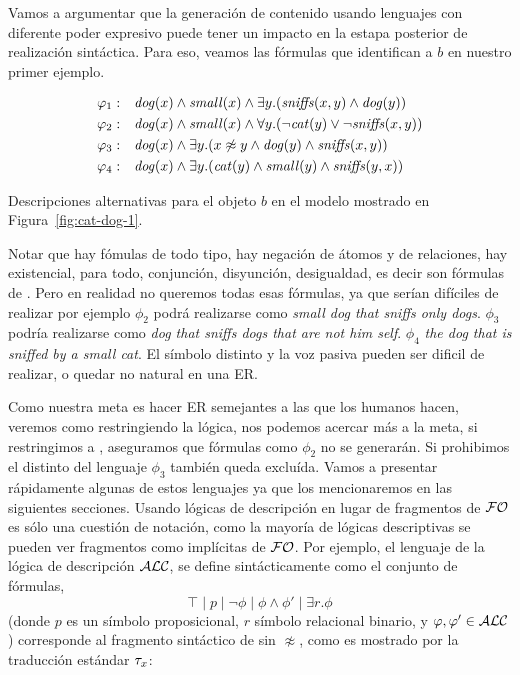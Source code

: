Vamos a argumentar que la generaci\'on de contenido usando lenguajes con diferente poder expresivo puede tener un impacto en la estapa posterior de realizaci\'on sint\'actica. Para eso, veamos las f\'ormulas que identifican a $b$ en nuestro primer ejemplo.

\begin{table}[h]
$$
\begin{array}{cl}
 \varphi_1: & \mathit{dog}(x) \land \mathit{small}(x) \land
   \exists y . (\mathit{sniffs}(x,y) \land \mathit{dog}(y))\\[3pt]
  \varphi_2: & \mathit{dog}(x) \land \mathit{small}(x) \land
  \forall y . (\neg \mathit{cat}(y) \lor \neg \mathit{sniffs}(x,y))\\[3pt]
  \varphi_3: & \mathit{dog}(x) \land
  \exists y . (x \not\approx y \land \mathit{dog}(y)  \land \mathit{sniffs}(x,y))\\[3pt]
  \varphi_4: & \mathit{dog}(x) \land
  \exists y . (\mathit{cat}(y) \land \mathit{small}(y) \land \mathit{sniffs}(y,x))
 \end{array}
$$
\caption{Descripciones alternativas para el objeto $b$ en el modelo mostrado en Figura~\ref{fig:cat-dog-1}.}\label{tab:gammas}
\end{table}

Notar que hay f\'omulas de todo tipo, hay negaci\'on de \'atomos y de relaciones, hay existencial, para todo, conjunci\'on, disyunci\'on, desigualdad, es decir son f\'ormulas de \FOL. Pero en realidad no queremos todas esas f\'ormulas, ya que ser\'ian dif\'iciles de realizar por ejemplo $\phi_2$ podr\'a realizarse como {\it small dog that sniffs only dogs}. $\phi_3$ podr\'ia realizarse como {\it dog that sniffs dogs that are not him self}. $\phi_4$ {\it the dog that is sniffed by a small cat}. El s\'imbolo distinto y la voz pasiva pueden ser dificil de realizar, o quedar no natural en una ER.

Como nuestra meta es hacer ER semejantes a las que los humanos hacen, veremos como restringiendo la l\'ogica, nos podemos acercar m\'as a la meta, si restringimos a \EPFOL, aseguramos que f\'ormulas como  $\phi_2$ no se generar\'an. Si prohibimos el distinto del lenguaje  $\phi_3$ tambi\'en queda exclu\'ida.
Vamos a presentar r\'apidamente algunas de estos lenguajes ya que los mencionaremos en las siguientes secciones. Usando l\'ogicas de descripci\'on en lugar de fragmentos de $\mathcal{FO}$ es s\'olo una cuesti\'on de notaci\'on, como la mayor\'ia de l\'ogicas descriptivas se pueden ver
fragmentos como impl\'icitas de $\mathcal{FO}$. Por ejemplo, el lenguaje de la l\'ogica de descripci\'on $\mathcal{ALC}$, se define sint\'acticamente como el conjunto de f\'ormulas,
$$
\top \mid p \mid \neg \phi \mid \phi \wedge \phi' \mid  \exists r. \phi
$$
(donde $p$ es un s\'imbolo proposicional, $r$ s\'imbolo relacional binario, y $\varphi,\varphi' \in \mathcal{ALC}$) corresponde al fragmento sint\'actico de
\FOL sin $\not\approx$, como es mostrado por la traducci\'on est\'andar $\mathit{\tau}_x$:

